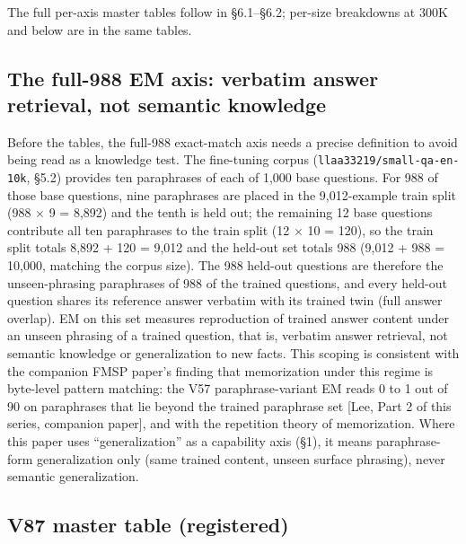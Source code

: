 \documentclass[11pt]{article}
\begin{document}
The full per-axis master tables follow in \S6.1--\S6.2; per-size breakdowns at 300K and below are in the same tables.

\subsection{The full-988 EM axis: verbatim answer retrieval, not semantic knowledge}

Before the tables, the full-988 exact-match axis needs a precise definition to avoid being read as a knowledge test. The fine-tuning corpus (\texttt{llaa33219/small-qa-en-10k}, \S5.2) provides ten paraphrases of each of 1,000 base questions. For 988 of those base questions, nine paraphrases are placed in the 9,012-example train split (988 $\times$ 9 = 8,892) and the tenth is held out; the remaining 12 base questions contribute all ten paraphrases to the train split (12 $\times$ 10 = 120), so the train split totals 8,892 + 120 = 9,012 and the held-out set totals 988 (9,012 + 988 = 10,000, matching the corpus size). The 988 held-out questions are therefore the unseen-phrasing paraphrases of 988 of the trained questions, and every held-out question shares its reference answer verbatim with its trained twin (full answer overlap). EM on this set measures reproduction of trained answer content under an unseen phrasing of a trained question, that is, verbatim answer retrieval, not semantic knowledge or generalization to new facts. This scoping is consistent with the companion FMSP paper's finding that memorization under this regime is byte-level pattern matching: the V57 paraphrase-variant EM reads 0 to 1 out of 90 on paraphrases that lie beyond the trained paraphrase set [Lee, Part 2 of this series, companion paper], and with the repetition theory of memorization. Where this paper uses ``generalization'' as a capability axis (\S1), it means paraphrase-form generalization only (same trained content, unseen surface phrasing), never semantic generalization.

\subsection{V87 master table (registered)}
\end{document}
